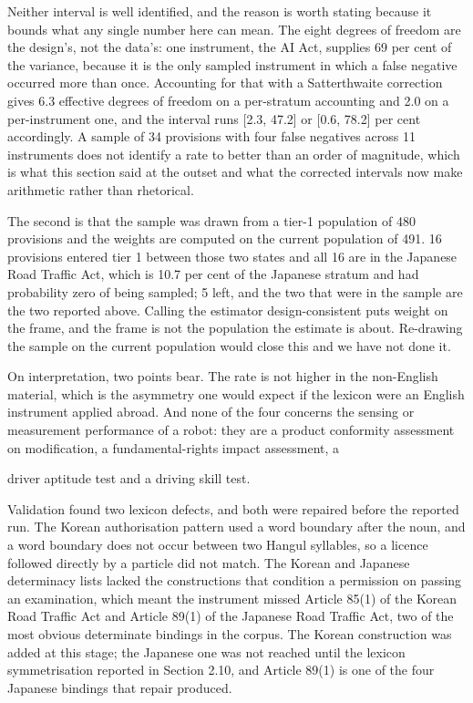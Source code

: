 Neither interval is well identified, and the reason is worth stating because it bounds what any single number here can mean. The eight degrees of freedom are the design's, not the data's: one instrument, the AI Act, supplies 69 per cent of the variance, because it is the only sampled instrument in which a false negative occurred more than once. Accounting for that with a Satterthwaite correction gives 6.3 effective degrees of freedom on a per-stratum accounting and 2.0 on a per-instrument one, and the interval runs [2.3, 47.2] or [0.6, 78.2] per cent accordingly. A sample of 34 provisions with four false negatives across 11 instruments does not identify a rate to better than an order of magnitude, which is what this section said at the outset and what the corrected intervals now make arithmetic rather than rhetorical.

The second is that the sample was drawn from a tier-1 population of 480 provisions and the weights are computed on the current population of 491. 16 provisions entered tier 1 between those two states and all 16 are in the Japanese Road Traffic Act, which is 10.7 per cent of the Japanese stratum and had probability zero of being sampled; 5 left, and the two that were in the sample are the two reported above. Calling the estimator design-consistent puts weight on the frame, and the frame is not the population the estimate is about. Re-drawing the sample on the current population would close this and we have not done it.

On interpretation, two points bear. The rate is not higher in the non-English material, which is the asymmetry one would expect if the lexicon were an English instrument applied abroad. And none of the four concerns the sensing or measurement performance of a robot: they are a product conformity assessment on modification, a fundamental-rights impact assessment, a

driver aptitude test and a driving skill test.

Validation found two lexicon defects, and both were repaired before the reported run. The Korean authorisation pattern used a word boundary after the noun, and a word boundary does not occur between two Hangul syllables, so a licence followed directly by a particle did not match. The Korean and Japanese determinacy lists lacked the constructions that condition a permission on passing an examination, which meant the instrument missed Article 85(1) of the Korean Road Traffic Act and Article 89(1) of the Japanese Road Traffic Act, two of the most obvious determinate bindings in the corpus. The Korean construction was added at this stage; the Japanese one was not reached until the lexicon symmetrisation reported in Section 2.10, and Article 89(1) is one of the four Japanese bindings that repair produced.

